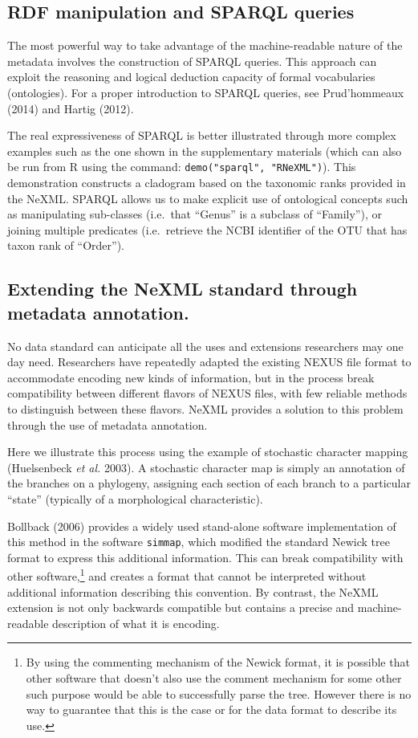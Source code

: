 \documentclass[author-year, review, 11pt]{components/elsarticle} %
\begin{document}
\subsection{RDF manipulation and SPARQL
queries}\label{rdf-manipulation-and-sparql-queries}

The most powerful way to take advantage of the machine-readable nature
of the metadata involves the construction of SPARQL queries. This
approach can exploit the reasoning and logical deduction capacity of
formal vocabularies (ontologies). For a proper introduction to SPARQL
queries, see Prud'hommeaux (2014) and Hartig (2012).

The real expressiveness of SPARQL is better illustrated through more
complex examples such as the one shown in the supplementary materials
(which can also be run from R using the command:
\texttt{demo("sparql", "RNeXML")}). This demonstration constructs a
cladogram based on the taxonomic ranks provided in the NeXML. SPARQL
allows us to make explicit use of ontological concepts such as
manipulating sub-classes (i.e.~that ``Genus'' is a subclass of
``Family''), or joining multiple predicates (i.e.~retrieve the NCBI
identifier of the OTU that has taxon rank of ``Order'').

\subsection{Extending the NeXML standard through metadata
annotation.}\label{extending-the-nexml-standard-through-metadata-annotation.}

No data standard can anticipate all the uses and extensions researchers
may one day need. Researchers have repeatedly adapted the existing NEXUS
file format to accommodate encoding new kinds of information, but in the
process break compatibility between different flavors of NEXUS files,
with few reliable methods to distinguish between these flavors. NeXML
provides a solution to this problem through the use of metadata
annotation.

Here we illustrate this process using the example of stochastic
character mapping (Huelsenbeck \emph{et al.} 2003). A stochastic
character map is simply an annotation of the branches on a phylogeny,
assigning each section of each branch to a particular ``state''
(typically of a morphological characteristic).

Bollback (2006) provides a widely used stand-alone software
implementation of this method in the software \texttt{simmap}, which
modified the standard Newick tree format to express this additional
information. This can break compatibility with other software,\footnote{By
  using the commenting mechanism of the Newick format, it is possible
  that other software that doesn't also use the comment mechanism for
  some other such purpose would be able to successfully parse the tree.
  However there is no way to guarantee that this is the case or for the
  data format to describe its use.} and creates a format that cannot be
interpreted without additional information describing this convention.
By contrast, the NeXML extension is not only backwards compatible but
contains a precise and machine-readable description of what it is
encoding.
\end{document}
